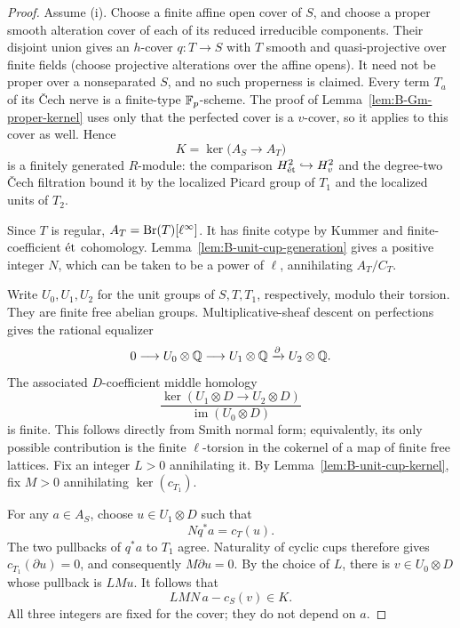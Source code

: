 \begin{proof}
Assume (i).  Choose a finite affine open cover of \(S\),
and choose a proper smooth alteration cover of each of its
reduced irreducible components.  Their disjoint union gives
an \(h\)-cover \(q:T\to S\) with \(T\) smooth and
quasi-projective over finite fields (choose projective
alterations over the affine opens).  It need not be proper over a
nonseparated \(S\), and no such properness is claimed.
Every term \(T_a\) of its \v Cech nerve is a finite-type
\(\mathbb F_p\)-scheme.  The proof of
Lemma~\ref{lem:B-Gm-proper-kernel} uses only that the
perfected cover is a \(v\)-cover, so it applies to this
cover as well.  Hence
\[
 K=\ker\bigl(A_S\longrightarrow A_T\bigr)
\]
is a finitely generated \(R\)-module: the comparison
\(H^2_{\mathrm{\acute et}}\hookrightarrow H^2_v\) and the degree-two
\v Cech filtration bound it by the localized Picard group
of \(T_1\) and the localized units of \(T_2\).

Since \(T\) is regular, \(A_T=\operatorname{Br}(T)[\ell^\infty]\).
It has finite cotype by Kummer and finite-coefficient \(\mathrm{\acute et}\)
cohomology.  Lemma~\ref{lem:B-unit-cup-generation} gives
a positive integer \(N\), which can be taken to be a
power of \(\ell\), annihilating \(A_T/C_T\).

Write \(U_0,U_1,U_2\) for the unit groups of
\(S,T,T_1\), respectively, modulo their torsion.
They are finite free abelian groups.  Multiplicative-sheaf
descent on perfections gives the rational equalizer
\[
 0\longrightarrow U_0\otimes\mathbb Q
   \longrightarrow U_1\otimes\mathbb Q
   \xrightarrow{\partial}U_2\otimes\mathbb Q.
\]
The associated \(D\)-coefficient middle homology
\[
 \frac{\ker(U_1\otimes D\to U_2\otimes D)}
             {\operatorname{im}(U_0\otimes D)}
\]
is finite.  This follows directly from Smith normal form;
equivalently, its only possible contribution is the finite
\(\ell\)-torsion in the cokernel of a map of finite
free lattices.  Fix an integer \(L>0\) annihilating it.
By Lemma~\ref{lem:B-unit-cup-kernel}, fix \(M>0\)
annihilating \(\ker(c_{T_1})\).

For any \(a\in A_S\), choose \(u\in U_1\otimes D\)
such that
\[
             Nq^*a=c_T(u).
\]
The two pullbacks of \(q^*a\) to \(T_1\) agree.
Naturality of cyclic cups therefore gives
\(c_{T_1}(\partial u)=0\), and consequently
\(M\partial u=0\).  By the choice of \(L\), there
is \(v\in U_0\otimes D\) whose pullback is \(LMu\).
It follows that
\begin{equation}
        LMN\,a-c_S(v)\in K.
 \label{eq:B-global-unit-finite-error}
\end{equation}
All three integers are fixed for the cover; they do not
depend on \(a\).


\end{proof}
